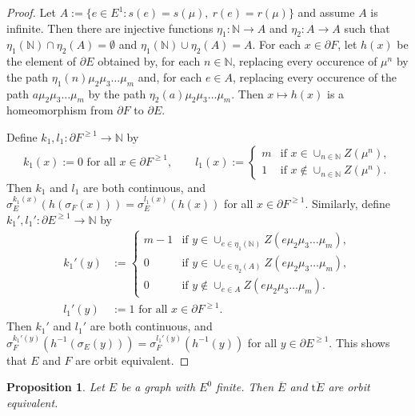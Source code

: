 \documentclass[12pt, a4paper]{amsart}
\numberwithin{equation}{section}
\newtheorem{prop}[thm]{Proposition}
\theoremstyle{definition}
\theoremstyle{remark}
\begin{document}
\begin{proof}
	Let $A:=\{e\in E^1: s(e)=s(\mu),\ r(e)=r(\mu)\}$ and assume $A$ is infinite. Then there are injective functions $\eta_1:{\mathbb{N}}\to A$ and $\eta_2:A\to A$ such that $\eta_1({\mathbb{N}})\cap\eta_2(A)=\emptyset$ and $\eta_1({\mathbb{N}})\cup\eta_2(A)=A$. For each $x\in\partial F$, let $h(x)$ be the element of $\partial E$ obtained by, for each $n\in{\mathbb{N}}$, replacing every occurence of $\mu^n$ by the path $\eta_1(n)\mu_2\mu_3\dots\mu_m$ and, for each $e\in A$, replacing every occurence of the path $a\mu_2\mu_3\dots\mu_m$ by the path $\eta_2(a)\mu_2\mu_3\dots\mu_m$. Then $x\mapsto h(x)$ is a homeomorphism from $\partial F$ to $\partial E$.
	
	Define $k_1,l_1:\partial F^{\ge 1}\to{\mathbb{N}}$ by 
	\begin{equation*}
		k_1(x):=0\text{ for all }x\in\partial F^{\ge 1},\qquad l_1(x):=
		\begin{cases}
			m&\text{if }x\in\cup_{n\in{\mathbb{N}}}Z(\mu^n),\\
			1&\text{if }x\notin\cup_{n\in{\mathbb{N}}}Z(\mu^n).
		\end{cases}
	\end{equation*}
	Then $k_1$ and $l_1$ are both continuous, and 
	$\sigma_E^{k_1(x)}(h(\sigma_F(x)))=\sigma_E^{l_1(x)}(h(x))$ for all 
	$x\in\partial F^{\ge 1}$. Similarly, define $k_1',l_1':\partial E^{\ge 
	1}\to{\mathbb{N}}$ by 
	\begin{align*}
		k_1'(y)&:=
		\begin{cases}
			m-1&\text{if }y\in\cup_{e\in\eta_1({\mathbb{N}})}Z(e\mu_2\mu_3\dots\mu_m),\\
			0&\text{if }y\in\cup_{e\in\eta_2(A)}Z(e\mu_2\mu_3\dots\mu_m),\\
			0&\text{if }y\notin\cup_{e\in A}Z(e\mu_2\mu_3\dots\mu_m).
		\end{cases} \\
		 l_1'(y)&:=1\text{ for all }x\in\partial F^{\ge 1}.
	\end{align*}
	Then $k_1'$ and $l_1'$ are both continuous, and $\sigma_F^{k_1'(y)}(h^{-1}(\sigma_E(y)))=\sigma_F^{l_1'(y)}(h^{-1}(y))$ for all $y\in\partial E^{\ge 1}$. This shows that $E$ and $F$ are orbit equivalent.
\end{proof}

\begin{prop}\label{prop:trans}
	Let $E$ be a graph with $E^0$ finite. Then $\overline{E}$ and ${\overline{\mathrm{t}{E}}}$ are 
	orbit equivalent.
\end{prop}
\end{document}
